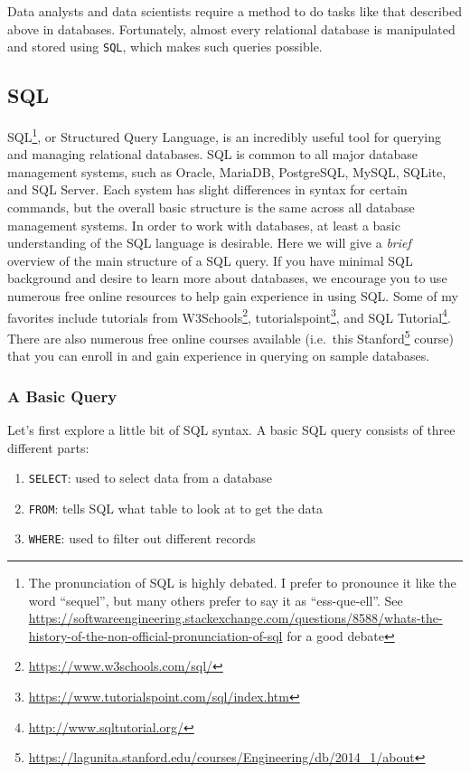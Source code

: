 \documentclass[]{krantz}
\providecommand{\tightlist}{%
  \setlength{\itemsep}{0pt}\setlength{\parskip}{0pt}}
\renewcommand{\href}[2]{#2\footnote{\url{#1}}}
\begin{document}
Data analysts and data scientists require a method to do tasks like that
described above in databases. Fortunately, almost every relational
database is manipulated and stored using \texttt{SQL}, which makes such
queries possible.

\subsection{SQL}\label{sql}

SQL\footnote{The pronunciation of SQL is highly debated. I prefer to
  pronounce it like the word ``sequel'', but many others prefer to say
  it as ``ess-que-ell''. See
  \url{https://softwareengineering.stackexchange.com/questions/8588/whats-the-history-of-the-non-official-pronunciation-of-sql}
  for a good debate}, or Structured Query Language, is an incredibly
useful tool for querying and managing relational databases. SQL is
common to all major database management systems, such as Oracle,
MariaDB, PostgreSQL, MySQL, SQLite, and SQL Server. Each system has
slight differences in syntax for certain commands, but the overall basic
structure is the same across all database management systems. In order
to work with databases, at least a basic understanding of the SQL
language is desirable. Here we will give a \emph{brief} overview of the
main structure of a SQL query. If you have minimal SQL background and
desire to learn more about databases, we encourage you to use numerous
free online resources to help gain experience in using SQL. Some of my
favorites include tutorials from
\href{https://www.w3schools.com/sql/}{W3Schools},
\href{https://www.tutorialspoint.com/sql/index.htm}{tutorialspoint}, and
\href{http://www.sqltutorial.org/}{SQL Tutorial}. There are also
numerous free online courses available (i.e.~this
\href{https://lagunita.stanford.edu/courses/Engineering/db/2014_1/about}{Stanford}
course) that you can enroll in and gain experience in querying on sample
databases.

\subsubsection{A Basic Query}\label{a-basic-query}

Let's first explore a little bit of SQL syntax. A basic SQL query
consists of three different parts:

\begin{enumerate}
\def\labelenumi{\arabic{enumi}.}
\tightlist
\item
  \texttt{SELECT}: used to select data from a database
\item
  \texttt{FROM}: tells SQL what table to look at to get the data
\item
  \texttt{WHERE}: used to filter out different records
\end{enumerate}
\end{document}
